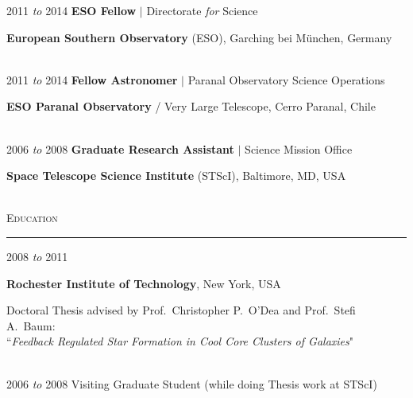 \documentclass[11pt]{article}
\makeatletter
\def\vhrulefill#1{\leavevmode\leaders\hrule\@height#1\hfill \kern\z@}
\makeatother
\begin{document}
\hspace{2.5mm} 2011 \textit{to} 2014 \hspace{17mm} \textbf{ESO Fellow} $|$ Directorate \textit{for} Science

\hspace{42mm} \parbox{5.15in}{\textbf{European Southern Observatory} (ESO), Garching bei M\"{u}nchen, Germany}\\




\hspace{2.5mm} 2011 \textit{to} 2014 \hspace{17mm} \textbf{Fellow Astronomer} $|$ Paranal Observatory Science Operations

\hspace{42mm} \parbox{5.15in}{\textbf{ESO Paranal Observatory} / Very Large Telescope, Cerro Paranal, Chile} \\



\hspace{2.5mm} 2006 \textit{to} 2008 \hspace{17mm} \textbf{Graduate Research Assistant} $|$ Science Mission Office

\hspace{42mm} \parbox{5.15in}{\textbf{Space Telescope Science Institute} (STScI), Baltimore, MD, USA} \\



\textsc{Education} \vhrulefill{0.4pt}

\vspace{2mm}


\hspace{2.5mm}2008 \textit{to} 2011 

\hspace{42mm}\parbox{5.15in}{\textbf{Rochester Institute of Technology}, New York, USA \\}

\hspace{42mm} \parbox{5.15in}{Doctoral Thesis advised by Prof.~Christopher P.~O'Dea and Prof.~Stefi A.~Baum: \\ ``\textit{Feedback Regulated Star Formation in Cool Core Clusters of Galaxies}"} \\




\hspace{2.5mm}2006 \textit{to} 2008  \hspace{18mm} Visiting Graduate Student (while doing Thesis work at STScI)
\end{document}
